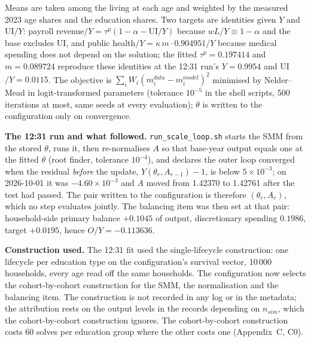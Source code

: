 \documentclass[11pt,a4paper]{article}
\newcommand{\tabdir}{audit_2026-10-01}
\newcommand{\code}[1]{\texttt{#1}}
\newcommand{\stale}{\textcolor{red!70!black}{\textsc{stale}}}
\begin{document}
Means are taken among the living at each age and weighted by the measured 2023 age shares and the education shares. Two targets are identities given $Y$ and UI$/Y$: payroll revenue$/Y = \tau^p(1 - \alpha - \mathrm{UI}/Y)$ because $w L/Y \equiv 1 - \alpha$ and the base excludes UI, and public health$/Y = \kappa\, m \cdot 0.904951/Y$ because medical spending does not depend on the solution; the fitted $\tau^p = 0.197414$ and $m = 0.089724$ reproduce these identities at the 12:31 run's $Y = 0.9954$ and UI$/Y = 0.0115$. The objective is $\sum_i W_i (m_i^{data} - m_i^{model})^2$ minimised by Nelder--Mead in logit-transformed parameters (tolerance $10^{-5}$ in the shell scripts, 500 iterations at most, same seeds at every evaluation); $\theta$ is written to the configuration only on convergence.

\begin{table}[htbp]\centering\footnotesize
\caption{Moments as printed on 2026-10-01 22:23, read from the 12:31 markdown report (\stale): fitted at $A = 1.42370$ before the normalisation moved $A$ to $1.42761$, at which the normalisation log shows $A/Y = 4.0439$ (+1.10\%) and public health$/Y = 0.0537$; UI$/Y$ is filed as not targeted although the configuration targets it, and its deviation cell prints the absolute gap $+0.005$ as 0.01 (relative: +83\%). Five parameters, single-lifecycle construction, $n_{sim} = 10\,000$ per education type, pension floor 0.15, 169 Nelder--Mead iterations, 286 s.}

\end{table}

\textbf{The 12:31 run and what followed.} \code{run_scale_loop.sh} starts the SMM from the stored $\theta$, runs it, then re-normalises $A$ so that base-year output equals one at the fitted $\theta$ (root finder, tolerance $10^{-4}$), and declares the outer loop converged when the residual \emph{before} the update, $Y(\theta_r, A_{r-1}) - 1$, is below $5\times 10^{-3}$; on 2026-10-01 it was $-4.60\times 10^{-3}$ and $A$ moved from 1.42370 to 1.42761 after the test had passed. The pair written to the configuration is therefore $(\theta_r, A_r)$, which no step evaluates jointly. The balancing item was then set at that pair: household-side primary balance $+0.1045$ of output, discretionary spending $0.1986$, target $+0.0195$, hence $O/Y = -0.113636$.

\textbf{Construction used.} The 12:31 fit used the single-lifecycle construction: one lifecycle per education type on the configuration's survival vector, 10\,000 households, every age read off the same households. The configuration now selects the cohort-by-cohort construction for the SMM, the normalisation and the balancing item. The construction is not recorded in any log or in the metadata; the attribution rests on the output levels in the records depending on $n_{sim}$, which the cohort-by-cohort construction ignores. The cohort-by-cohort construction costs 60 solves per education group where the other costs one (Appendix~C, C0).
\end{document}
